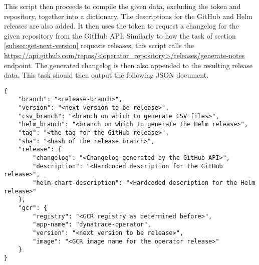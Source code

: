 This script then proceeds to compile the given data, excluding the token and repository, together into a dictionary.
The descriptions for the GitHub and Helm releases are also added.
It then uses the token to request a changelog for the given repository from the GitHub API.
Similarly to how the task of section \ref{subsec:get-next-version} requests releases, this script calls the \url{https://api.github.com/repos/<operator_repository>/releases/generate-notes} endpoint.
The generated changelog is then also appended to the resulting release data.
This task should then output the following JSON document.

\begin{verbatim}
{
    "branch": "<release-branch>",
    "version": "<next version to be release>",
    "csv_branch": "<branch on which to generate CSV files>",
    "helm_branch": "<branch on which to generate the Helm release>",
    "tag": "<the tag for the GitHub release>",
    "sha": "<hash of the release branch>",
    "release": {
        "changelog": "<Changelog generated by the GitHub API>",
        "description": "<Hardcoded description for the GitHub release>",
        "helm-chart-description": "<Hardcoded description for the Helm release>"
    },
    "gcr": {
        "registry": "<GCR registry as determined before>",
        "app-name": "dynatrace-operator",
        "version": "<next version to be release>",
        "image": "<GCR image name for the operator release>"
    }
}
\end{verbatim}
